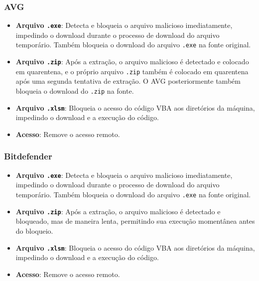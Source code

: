 \documentclass[12pt]{article}
\begin{document}
\subsubsection*{AVG}
\begin{itemize}
    \item \textbf{Arquivo \texttt{.exe}}: Detecta e bloqueia o arquivo malicioso imediatamente, impedindo o download durante o processo de download do arquivo temporário. Também bloqueia o download do arquivo \texttt{.exe} na fonte original.
    \item \textbf{Arquivo \texttt{.zip}}: Após a extração, o arquivo malicioso é detectado e colocado em quarentena, e o próprio arquivo \texttt{.zip} também é colocado em quarentena após uma segunda tentativa de extração. O AVG posteriormente também bloqueia o download do \texttt{.zip} na fonte.
    \item \textbf{Arquivo \texttt{.xlsm}}: Bloqueia o acesso do código VBA aos diretórios da máquina, impedindo o download e a execução do código.
    \item \textbf{Acesso}: Remove o acesso remoto.
\end{itemize}

\subsubsection*{Bitdefender}
\begin{itemize}
    \item \textbf{Arquivo \texttt{.exe}}: Detecta e bloqueia o arquivo malicioso imediatamente, impedindo o download durante o processo de download do arquivo temporário. Também bloqueia o download do arquivo \texttt{.exe} na fonte original.
    \item \textbf{Arquivo \texttt{.zip}}: Após a extração, o arquivo malicioso é detectado e bloqueado, mas de maneira lenta, permitindo sua execução momentânea antes do bloqueio.
    \item \textbf{Arquivo \texttt{.xlsm}}: Bloqueia o acesso do código VBA aos diretórios da máquina, impedindo o download e a execução do código.
    \item \textbf{Acesso}: Remove o acesso remoto.
\end{itemize}
\end{document}
